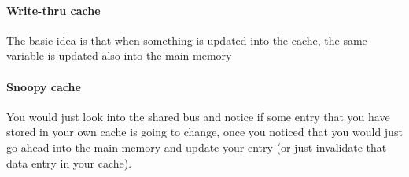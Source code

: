 \documentclass{article}
\begin{document}
      \paragraph{Write-thru cache} The basic idea is that when something is updated into the 
        cache, the same variable is updated also into the main memory
      \paragraph{Snoopy cache} You would just look into the shared bus and notice if some 
        entry that you have stored in your own cache is going to change, once you noticed that
        you would just go ahead into the main memory and update your entry (or just invalidate
        that data entry in your cache).
\end{document}
